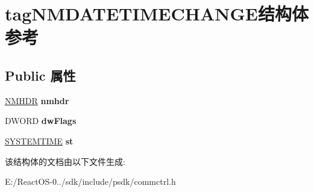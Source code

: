 \hypertarget{structtag_n_m_d_a_t_e_t_i_m_e_c_h_a_n_g_e}{}\section{tag\+N\+M\+D\+A\+T\+E\+T\+I\+M\+E\+C\+H\+A\+N\+G\+E结构体 参考}
\label{structtag_n_m_d_a_t_e_t_i_m_e_c_h_a_n_g_e}
\subsection*{Public 属性}
\begin{DoxyCompactItemize}
\item 
\mbox{\label{structtag_n_m_d_a_t_e_t_i_m_e_c_h_a_n_g_e_af15f0cbc9dff43f6242bd707b83edf33}} 
\hyperlink{structtag_n_m_h_d_r}{N\+M\+H\+DR} {\bfseries nmhdr}
\item 
\mbox{\label{structtag_n_m_d_a_t_e_t_i_m_e_c_h_a_n_g_e_aabc8fcea64c0db56b3b792f61000d95e}} 
D\+W\+O\+RD {\bfseries dw\+Flags}
\item 
\mbox{\label{structtag_n_m_d_a_t_e_t_i_m_e_c_h_a_n_g_e_a1d6d3e2eb7632168e80796d212e6f811}} 
\hyperlink{struct___s_y_s_t_e_m_t_i_m_e}{S\+Y\+S\+T\+E\+M\+T\+I\+ME} {\bfseries st}
\end{DoxyCompactItemize}


该结构体的文档由以下文件生成\+:\begin{DoxyCompactItemize}
\item 
E\+:/\+React\+O\+S-\/0../sdk/include/psdk/commctrl.\+h\end{DoxyCompactItemize}
